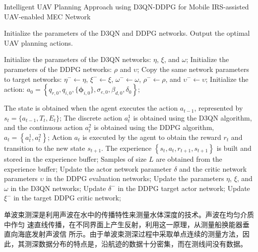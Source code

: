 \documentclass[withoutpreface,bwprint]{cumcmthesis} %
\begin{document}
      \begin{algorithm}[H]
        \caption{Intelligent UAV Planning Approach using D3QN-DDPG for Mobile IRS-assisted UAV-enabled MEC Network}
        \label{alg1}
        \begin{algorithmic}[1]
        \Require Initialize the parameters of the D3QN and DDPG networks.
        \Ensure Output the optimal UAV planning actions.
        
        \State Initialize the parameters of the D3QN networks: $\eta$, $\xi$, and $\omega$;
        \State Initialize the parameters of the DDPG networks: $\rho$ and $\upsilon$;
        \State Copy the same network parameters to target networks: $\eta^{-} \leftarrow \eta$, $\xi^{-} \leftarrow \xi$, $\omega^{-} \leftarrow \omega$, $\rho^{-} \leftarrow \rho$, and $\upsilon^{-} \leftarrow \upsilon$;
        \State Initialize the action: $a_0=\left\{q_{r,0}, q_{i,0}, \{\boldsymbol{\phi}_{i,0}\},\sigma_{e,0},\beta_{d,0}, \delta_0\right\}$;
        
        \State The state is obtained when the agent executes the action $a_{t-1}$, represented by $s_t=\biggl\{a_{t-1}, T_t, E_t\biggr\}$;
        \State The discrete action $a_{t}^1$ is obtained using the D3QN algorithm, and the continuous action $a_{t}^2$ is obtained using the DDPG algorithm, $a_{t}=\left\{a_{t}^1, a_{t}^2\right\}$;
        \State Action $a_{t}$ is executed by the agent to obtain the reward $r_{t}$ and transition to the new state $s_{t+1}$.
        \State The experience $\left\{s_{t}, a_{t}, r_{t+1}, s_{t+1}\right\}$ is built and stored in the experience buffer;
        \State Samples of size $L$ are obtained from the experience buffer;
        \State Update the actor network parameter $\delta$ and the critic network parameters $\upsilon$ in the DDPG evaluation networks;
        \State Update the parameters $\eta$, $\xi$, and $\omega$ in the D3QN networks;
        \State Update $\delta^{-}$ in the DDPG target actor network;
        \State Update $\xi^{-}$ in the target DDPG critic network;
        \EndFor
        \EndFor
        \end{algorithmic}
      \end{algorithm}


    单波束测深是利用声波在水中的传播特性来测量水体深度的技术。声波在均匀介质中作匀
速直线传播，在不同界面上产生反射，利用这一原理，从测量船换能器垂直向海底发射声波信
所示。由于单波束测深过程中采取单点连续的测量方法，因
此，其测深数据分布的特点是，沿航迹的数据十分密集，而在测线间没有数据。
\end{document}
